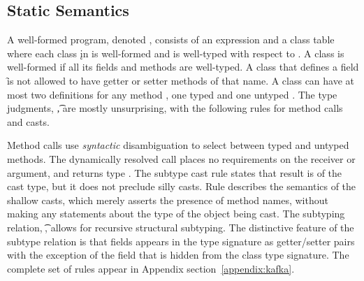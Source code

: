 \documentclass[a4paper,USenglish]{tex/lipics-v2016}
\begin{document}


\subsection{Static Semantics}

A well-formed program, denoted \WFp\e\K, consists of an expression \e and a
class table \K where each class \k in \K is well-formed and \e is well-typed
with respect to \K.  A class is well-formed if all its fields and methods
are well-typed. A class that defines a field \f is not allowed to have
getter or setter methods of that name.  A class can have at most two
definitions for any method \m, one typed \Mdef\m\x\C\D\e and one untyped
\Mdef\m\x\any\any\e. The type judgments, \EnvType\Env\s\K\e\t, are mostly
unsurprising, with the following rules for method calls and casts.

{\small
\begin{mathpar}



\end{mathpar}}

\noindent Method calls use \emph{syntactic} disambiguation to select between
typed and untyped methods. The dynamically resolved call places no
requirements on the receiver or argument, and returns type \any. The subtype
cast rule  states that result is of the cast type, but it does
not preclude silly casts.  Rule  describes the semantics of the
shallow casts, which merely asserts the presence of method names, without
making any statements about the type of the object being cast.  The
subtyping relation, \StrSub\M\K\t\tp, allows for recursive structural
subtyping. The distinctive feature of the subtype relation is that fields
appears in the type signature as getter/setter pairs with the exception of
the \that field that is hidden from the class type signature.  The complete
set of rules appear in Appendix section~\ref{appendix:kafka}.
\end{document}
